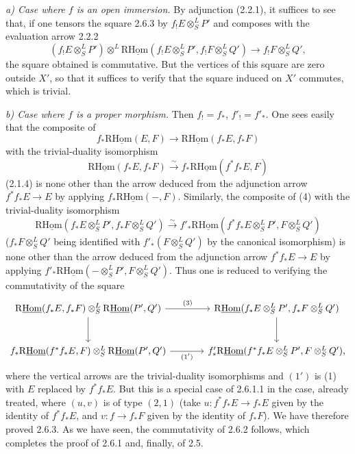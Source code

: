 \documentclass[11pt]{article}
\begin{document}
\emph{a) Case where $f$ is an open immersion.} By adjunction (2.2.1), it suffices to see that, if one tensors the square 2.6.3 by $f_!E\otimes^L_SP'$ and composes with the evaluation arrow 2.2.2
\[
(f_!E\otimes^L_SP')\otimes^L\mathrm{R}\underline{\mathrm{Hom}}(f_!E\otimes^L_SP',f_!F\otimes^L_SQ')\longrightarrow f_!F\otimes^L_SQ',
\]
the square obtained is commutative. But the vertices of this square are zero outside $X'$, so that it suffices to verify that the square induced on $X'$ commutes, which is trivial.

\emph{b) Case where $f$ is a proper morphism.} Then $f_!=f_*$, $f'_!=f'_*$. One sees easily that the composite of
\[
f_*\mathrm{R}\underline{\mathrm{Hom}}(E,F)\longrightarrow\mathrm{R}\underline{\mathrm{Hom}}(f_*E,f_*F)
\]
with the trivial-duality isomorphism
\[
\mathrm{R}\underline{\mathrm{Hom}}(f_*E,f_*F)\xrightarrow{\sim}f_*\mathrm{R}\underline{\mathrm{Hom}}(f^{*}f_*E,F)
\]
(2.1.4) is none other than the arrow deduced from the adjunction arrow $f^{*}f_*E\to E$ by applying $f_*\mathrm{R}\underline{\mathrm{Hom}}(-,F)$. Similarly, the composite of (4) with the trivial-duality isomorphism
\[
\mathrm{R}\underline{\mathrm{Hom}}(f_*E\otimes^L_SP',f_*F\otimes^L_SQ')\xrightarrow{\sim}f'_*\mathrm{R}\underline{\mathrm{Hom}}(f^{*}f_*E\otimes^L_SP',F\otimes^L_SQ')
\]
($f_*F\otimes^L_SQ'$ being identified with $f'_*(F\otimes^L_SQ')$ by the canonical isomorphism) is none other than the arrow deduced from the adjunction arrow $f^{*}f_*E\to E$ by applying $f'_*\mathrm{R}\underline{\mathrm{Hom}}(-\otimes^L_SP',F\otimes^L_SQ')$. Thus one is reduced to verifying the commutativity of the square
\[
\begin{tikzcd}[column sep=large,row sep=large]
\mathrm{R}\underline{\mathrm{Hom}}(f_*E,f_*F)\otimes^L_S\mathrm{R}\underline{\mathrm{Hom}}(P',Q') \arrow[r,"(3)"] \arrow[d] & \mathrm{R}\underline{\mathrm{Hom}}(f_*E\otimes^L_SP',f_*F\otimes^L_SQ') \arrow[d]\\
f_*\mathrm{R}\underline{\mathrm{Hom}}(f^{*}f_*E,F)\otimes^L_S\mathrm{R}\underline{\mathrm{Hom}}(P',Q') \arrow[r,"(1')"'] & f'_*\mathrm{R}\underline{\mathrm{Hom}}(f^{*}f_*E\otimes^L_SP',F\otimes^L_SQ'),
\end{tikzcd}
\]
where the vertical arrows are the trivial-duality isomorphisms and $(1')$ is (1) with $E$ replaced by $f^{*}f_*E$. But this is a special case of 2.6.1.1 in the case, already treated, where $(u,v)$ is of type $(2,1)$ (take $u:f^{*}f_*E\to f_*E$ given by the identity of $f^{*}f_*E$, and $v:f\to f_*F$ given by the identity of $f_*F$). We have therefore proved 2.6.3. As we have seen, the commutativity of 2.6.2 follows, which completes the proof of 2.6.1 and, finally, of 2.5.
\end{document}
